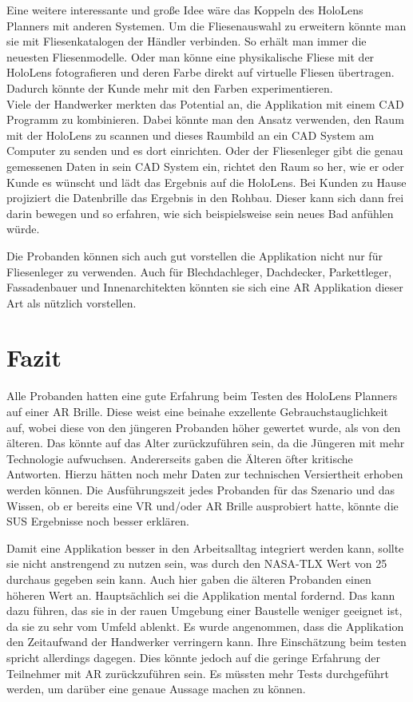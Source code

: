 Eine weitere interessante und große Idee wäre das Koppeln des HoloLens Planners mit anderen Systemen. Um die Fliesenauswahl zu erweitern könnte man sie mit Fliesenkatalogen der Händler verbinden. So erhält man immer die neuesten Fliesenmodelle. Oder man könne eine physikalische Fliese mit der HoloLens fotografieren und deren Farbe direkt auf virtuelle Fliesen übertragen. Dadurch könnte der Kunde mehr mit den Farben experimentieren. \\
Viele der Handwerker merkten das Potential an, die Applikation mit einem CAD Programm zu kombinieren. Dabei könnte man den Ansatz verwenden, den Raum mit der HoloLens zu scannen und dieses Raumbild an ein CAD System am Computer zu senden und es dort einrichten. Oder der Fliesenleger gibt die genau gemessenen Daten in sein CAD System ein, richtet den Raum so her, wie er oder Kunde es wünscht und lädt das Ergebnis auf die HoloLens. Bei Kunden zu Hause projiziert die Datenbrille das Ergebnis in den Rohbau. Dieser kann sich dann frei darin bewegen und so erfahren, wie sich beispielsweise sein neues Bad anfühlen würde.

Die Probanden können sich auch gut vorstellen die Applikation nicht nur für Fliesenleger zu verwenden. Auch für Blechdachleger, Dachdecker, Parkettleger, Fassadenbauer und Innenarchitekten könnten sie sich eine AR Applikation dieser Art als nützlich vorstellen.

\section{Fazit}

Alle Probanden hatten eine gute Erfahrung beim Testen des HoloLens Planners auf einer AR Brille. Diese weist eine beinahe exzellente Gebrauchstauglichkeit auf, wobei diese von den jüngeren Probanden höher gewertet wurde, als von den älteren. Das könnte auf das Alter zurückzuführen sein, da die Jüngeren mit mehr Technologie aufwuchsen. Andererseits gaben die Älteren öfter kritische Antworten. Hierzu hätten noch mehr Daten zur technischen Versiertheit erhoben werden können. Die Ausführungszeit jedes Probanden für das Szenario und das Wissen, ob er bereits eine VR und/oder AR Brille ausprobiert hatte, könnte die SUS Ergebnisse noch besser erklären.

Damit eine Applikation besser in den Arbeitsalltag integriert werden kann, sollte sie nicht anstrengend zu nutzen sein, was durch den NASA-TLX Wert von 25 durchaus gegeben sein kann. Auch hier gaben die älteren Probanden einen höheren Wert an. Hauptsächlich sei die Applikation mental fordernd. Das kann dazu führen, das sie in der rauen Umgebung einer Baustelle weniger geeignet ist, da sie zu sehr vom Umfeld ablenkt. Es wurde angenommen, dass die Applikation den Zeitaufwand der Handwerker verringern kann. Ihre Einschätzung beim testen spricht allerdings dagegen. Dies könnte jedoch auf die geringe Erfahrung der Teilnehmer mit AR zurückzuführen sein. Es müssten mehr Tests durchgeführt werden, um darüber eine genaue Aussage machen zu können.


